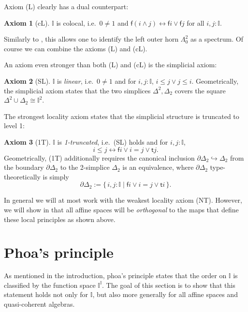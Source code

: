 \documentclass[12pt]{amsart}
\theoremstyle{definition}
\newtheorem*{axiom}{Axiom}
\newcommand{\mbb}[1]{\mathbb{#1}}
\newcommand{\I}{\mbb I}
\newcommand{\ms}[1]{\mathsf{#1}}
\newcommand{\scomp}[2]{\{\,#1\mid#2\,\}}
\newcommand{\hook}{\hookrightarrow}
\newcommand{\eq}{\leftrightarrow}
\begin{document}
Axiom (L) clearly has a dual counterpart:

\begin{axiom}[cL]\label{ax:cL}
  $\I$ is colocal, i.e.\ $0 \neq 1$ and $\ms f(i \wedge j) \eq \ms fi \vee \ms fj$ for all $i,j : \I$.
\end{axiom}

Similarly to , this allows one to identify the left outer horn $\Lambda^2_0$ as a spectrum. Of course we can combine the axioms (L) and (cL). 

An axiom even stronger than both (L) and (cL) is the simplicial axiom:

\begin{axiom}[SL]\label{ax:SL}
  $\I$ is \emph{linear}, i.e.\ $0 \neq 1$ and for $i,j : \I$, $i \le j \vee j \le i$. Geometrically, the simplicial axiom states that the two simplices $\Delta^2,\Delta_2$ covers the square $\Delta^2 \cup \Delta_2 \cong \I^2$.
\end{axiom}

The strongest locality axiom states that the simplicial structure is truncated to level 1:

\begin{axiom}[1T]\label{ax:1T}
  $\I$ is \emph{1-truncated}, i.e.\ (SL) holds and for $i,j : \I$, 
  \[ i \le j \eq \ms fi \vee i = j \vee \ms tj. \]
  Geometrically, (1T) additionally requires the canonical inclusion $\partial\Delta_2 \hook \Delta_2$ from the boundary $\partial\Delta_2$ to the 2-simplice $\Delta_2$ is an equivalence, where $\partial\Delta_2$ type-theoretically is simply
  \[ \partial\Delta_2 := \scomp{i,j : \I}{\ms fi \vee i = j \vee \ms ti}. \]
\end{axiom}

In general we will at most work with the weakest locality axiom (NT). However, we will show in  that all affine spaces will be \emph{orthogonal} to the maps that define these local principles as shown above.


\section{Phoa's principle}\label{sec:intposet}

As mentioned in the introduction, phoa's principle states that the order on $\I$ is classified by the function space $\I^\I$. The goal of this section is to show that this statement holds not only for $\I$, but also more generally for all affine spaces and quasi-coherent algebras.
\end{document}
